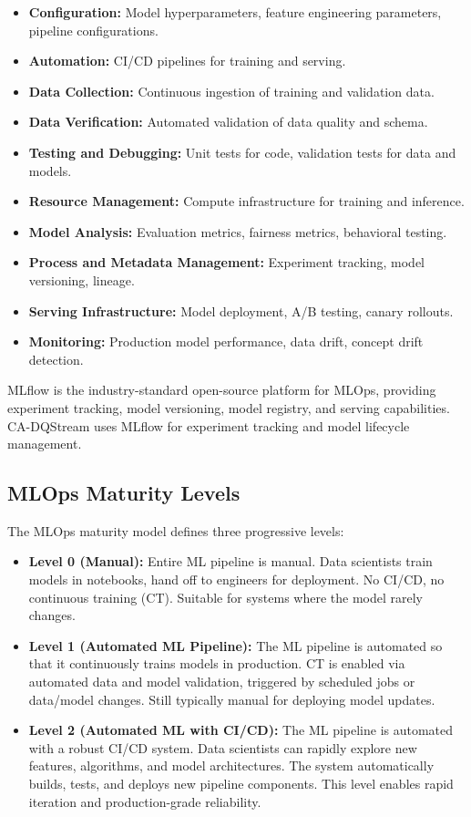 \begin{itemize}
    \item \textbf{Configuration:} Model hyperparameters, feature engineering parameters, pipeline configurations.
    \item \textbf{Automation:} CI/CD pipelines for training and serving.
    \item \textbf{Data Collection:} Continuous ingestion of training and validation data.
    \item \textbf{Data Verification:} Automated validation of data quality and schema.
    \item \textbf{Testing and Debugging:} Unit tests for code, validation tests for data and models.
    \item \textbf{Resource Management:} Compute infrastructure for training and inference.
    \item \textbf{Model Analysis:} Evaluation metrics, fairness metrics, behavioral testing.
    \item \textbf{Process and Metadata Management:} Experiment tracking, model versioning, lineage.
    \item \textbf{Serving Infrastructure:} Model deployment, A/B testing, canary rollouts.
    \item \textbf{Monitoring:} Production model performance, data drift, concept drift detection.
\end{itemize}

MLflow \citep{mlflow2024} is the industry-standard open-source platform for MLOps, providing experiment tracking, model versioning, model registry, and serving capabilities. CA-DQStream uses MLflow for experiment tracking and model lifecycle management.

\subsection{MLOps Maturity Levels}

The MLOps maturity model \citep{googlemlops2024} defines three progressive levels:

\begin{itemize}
    \item \textbf{Level 0 (Manual):} Entire ML pipeline is manual. Data scientists train models in notebooks, hand off to engineers for deployment. No CI/CD, no continuous training (CT). Suitable for systems where the model rarely changes.
    \item \textbf{Level 1 (Automated ML Pipeline):} The ML pipeline is automated so that it continuously trains models in production. CT is enabled via automated data and model validation, triggered by scheduled jobs or data/model changes. Still typically manual for deploying model updates.
    \item \textbf{Level 2 (Automated ML with CI/CD):} The ML pipeline is automated with a robust CI/CD system. Data scientists can rapidly explore new features, algorithms, and model architectures. The system automatically builds, tests, and deploys new pipeline components. This level enables rapid iteration and production-grade reliability.
\end{itemize}


